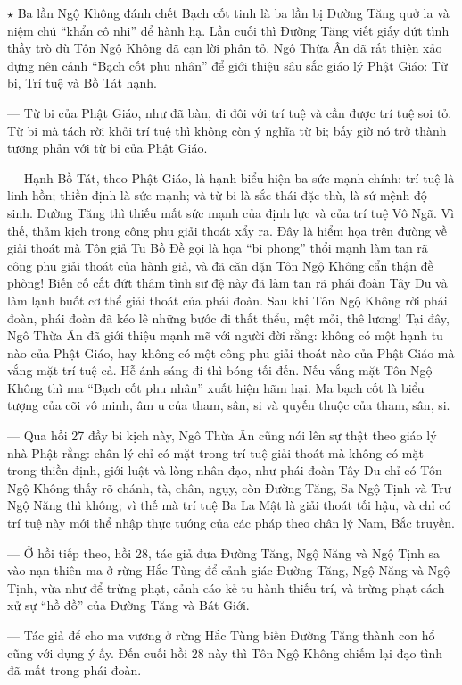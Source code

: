 $\star$ Ba lần Ngộ Không đánh chết Bạch cốt tinh là ba lần bị Đường Tăng quở la và niệm chú ``khẩn cô nhi'' để hành hạ. Lần cuối thì Đường Tăng viết giấy dứt tình thầy trò dù Tôn Ngộ Không đã cạn lời phân tỏ. Ngô Thừa Ân đã rất thiện xảo dựng nên cảnh ``Bạch cốt phu nhân'' để giới thiệu sâu sắc giáo lý Phật Giáo: Từ bi, Trí tuệ và Bồ Tát hạnh.

— Từ bi của Phật Giáo, như đã bàn, đi đôi với trí tuệ và cần được trí tuệ soi tỏ. Từ bi mà tách rời khỏi trí tuệ thì không còn ý nghĩa từ bi; bấy giờ nó trở thành tương phản với từ bi của Phật Giáo.

— Hạnh Bồ Tát, theo Phật Giáo, là hạnh biểu hiện ba sức mạnh chính: trí tuệ là linh hồn; thiền định là sức mạnh; và từ bi là sắc thái đặc thù, là sứ mệnh độ sinh. Đường Tăng thì thiếu mất sức mạnh của định lực và của trí tuệ Vô Ngã. Vì thế, thảm kịch trong công phu giải thoát xẩy ra. Đây là hiểm họa trên đường về giải thoát mà Tôn giả Tu Bồ Đề gọi là họa ``bi phong'' thổi mạnh làm tan rã công phu giải thoát của hành giả, và đã căn dặn Tôn Ngộ Không cẩn thận đề phòng! Biến cố cắt đứt thâm tình sư đệ này đã làm tan rã phái đoàn Tây Du và làm lạnh buốt cơ thể giải thoát của phái đoàn. Sau khi Tôn Ngộ Không rời phái đoàn, phái đoàn đã kéo lê những bước đi thất thểu, mệt mỏi, thê lương! Tại đây, Ngô Thừa Ân đã giới thiệu mạnh mẽ với người đời rằng: không có một hạnh tu nào của Phật Giáo, hay không có một công phu giải thoát nào của Phật Giáo mà vắng mặt trí tuệ cả. Hễ ánh sáng đi thì bóng tối đến. Nếu vắng mặt Tôn Ngộ Không thì ma ``Bạch cốt phu nhân'' xuất hiện hãm hại. Ma bạch cốt là biểu tượng của cõi vô minh, âm u của tham, sân, si và quyến thuộc của tham, sân, si.

— Qua hồi 27 đầy bi kịch này, Ngô Thừa Ân cũng nói lên sự thật theo giáo lý nhà Phật rằng: chân lý chỉ có mặt trong trí tuệ giải thoát mà không có mặt trong thiền định, giới luật và lòng nhân đạo, như phái đoàn Tây Du chỉ có Tôn Ngộ Không thấy rõ chánh, tà, chân, ngụy, còn Đường Tăng, Sa Ngộ Tịnh và Trư Ngộ Năng thì không; vì thế mà trí tuệ Ba La Mật là giải thoát tối hậu, và chỉ có trí tuệ này mới thể nhập thực tướng của các pháp theo chân lý Nam, Bắc truyền.

— Ở hồi tiếp theo, hồi 28, tác giả đưa Đường Tăng, Ngộ Năng và Ngộ Tịnh sa vào nạn thiên ma ở rừng Hắc Tùng để cảnh giác Đường Tăng, Ngộ Năng và Ngộ Tịnh, vừa như để trừng phạt, cảnh cáo kẻ tu hành thiếu trí, và trừng phạt cách xử sự ``hồ đồ'' của Đường Tăng và Bát Giới.

— Tác giả để cho ma vương ở rừng Hắc Tùng biến Đường Tăng thành con hổ cũng với dụng ý ấy. Đến cuối hồi 28 này thì Tôn Ngộ Không chiếm lại đạo tình đã mất trong phái đoàn.

